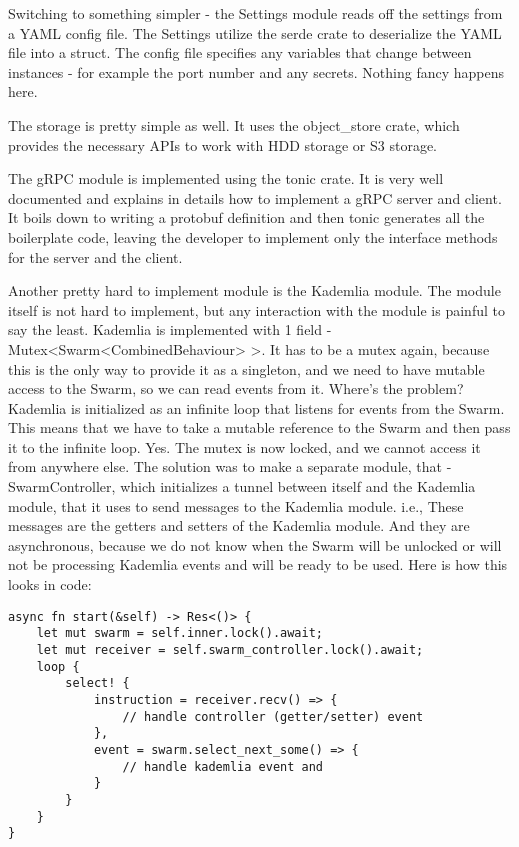 \documentclass[ twoside,openright,titlepage,numbers=noenddot,headinclude,%
                footinclude=true,cleardoublepage=empty,abstractoff, %
                BCOR=5mm,paper=a4,fontsize=11pt,%
                ngerman,american,%
                ]{scrreprt}
\begin{document}
Switching to something simpler - the Settings module reads off the settings from a YAML config file.
The Settings utilize the serde crate to deserialize the YAML file into a struct.
The config file specifies any variables that change between instances - for example the port number and any secrets.
Nothing fancy happens here.

The storage is pretty simple as well.
It uses the object\_store crate, which provides the necessary APIs to work with HDD storage or S3 storage.

The gRPC module is implemented using the tonic crate.
It is very well documented and explains in details how to implement a gRPC server and client.
It boils down to writing a protobuf definition and then tonic generates all the boilerplate code,
leaving the developer to implement only the interface methods for the server and the client.

Another pretty hard to implement module is the Kademlia module.
The module itself is not hard to implement, but any interaction with the module is painful to say the least.
Kademlia is implemented with 1 field - Mutex<Swarm<CombinedBehaviour> >.
It has to be a mutex again, because this is the only way to provide it as a singleton,
and we need to have mutable access to the Swarm, so we can read events from it.
Where's the problem? Kademlia is initialized as an infinite loop that listens for events from the Swarm.
This means that we have to take a mutable reference to the Swarm and then pass it to the infinite loop.
Yes. The mutex is now locked, and we cannot access it from anywhere else.
The solution was to make a separate module, that - SwarmController,
which initializes a tunnel between itself and the Kademlia module,
that it uses to send messages to the Kademlia module.
i.e., These messages are the getters and setters of the Kademlia module.
And they are asynchronous, because we do not know when the Swarm will be unlocked or will not be processing
Kademlia events and will be ready to be used.
Here is how this looks in code:

\begin{verbatim}
async fn start(&self) -> Res<()> {
    let mut swarm = self.inner.lock().await;
    let mut receiver = self.swarm_controller.lock().await;
    loop {
        select! {
            instruction = receiver.recv() => {
                // handle controller (getter/setter) event
            },
            event = swarm.select_next_some() => {
                // handle kademlia event and
            }
        }
    }
}
\end{verbatim}
\end{document}
